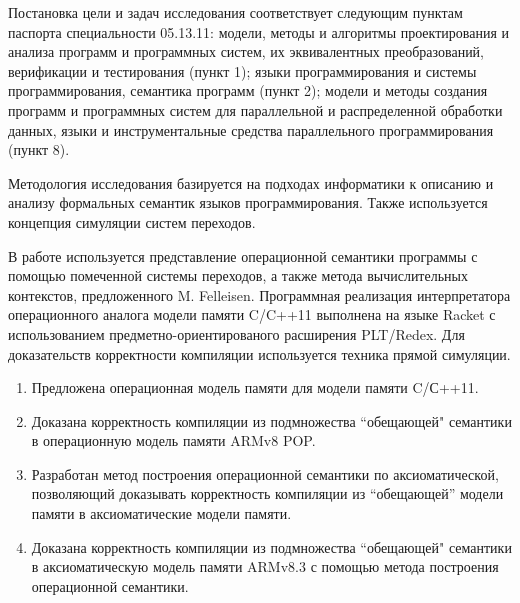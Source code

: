 Постановка цели и задач исследования соответствует следующим пунктам паспорта специальности 05.13.11:
модели, методы и алгоритмы проектирования и анализа программ и программных систем, их эквивалентных преобразований, верификации и тестирования (пункт 1);
языки программирования и системы программирования, семантика программ (пункт 2);
модели и методы создания программ и программных систем для параллельной и распределенной обработки данных,
языки и инструментальные средства параллельного программирования (пункт 8).

{\methods}
Методология исследования базируется на подходах информатики
к описанию и анализу формальных семантик языков программирования.
Также используется концепция симуляции систем переходов.

В работе используется представление операционной семантики программы с помощью помеченной системы переходов, а также
метода вычислительных контекстов, предложенного M. Felleisen.
Программная реализация интерпретатора операционного аналога модели памяти C/C++11 выполнена на языке Racket с использованием
предметно-ориентированого расширения PLT/Redex.
Для доказательств корректности компиляции используется техника прямой симуляции.

{}
\begin{enumerate}
  \item Предложена операционная модель памяти для модели памяти C/С++11.
  \item Доказана корректность компиляции из подмножества ``обещающей" \; семантики в операционную модель памяти ARMv8 POP.
  \item Разработан метод построения операционной семантики по аксиоматической, позволяющий доказывать корректность
        компиляции из ``обещающей'' модели памяти в аксиоматические модели памяти.
  \item Доказана корректность компиляции из подмножества ``обещающей" \; семантики в аксиоматическую модель памяти ARMv8.3
  с помощью метода построения операционной семантики.
\end{enumerate}

